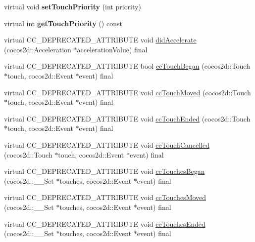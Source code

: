\begin{DoxyCompactItemize}
virtual void {\bfseries set\+Touch\+Priority} (int priority)
\item 
\mbox{\label{classcocostudio_1_1InputDelegate_a5bb459b5e2d2d90d8d548bcb4b376c0d}} 
virtual int {\bfseries get\+Touch\+Priority} () const
\item 
virtual C\+C\+\_\+\+D\+E\+P\+R\+E\+C\+A\+T\+E\+D\+\_\+\+A\+T\+T\+R\+I\+B\+U\+TE void \hyperlink{classcocostudio_1_1InputDelegate_a9d0d273d96b520c48e76a04db3528183}{did\+Accelerate} (cocos2d\+::\+Acceleration $\ast$acceleration\+Value) final
\item 
virtual C\+C\+\_\+\+D\+E\+P\+R\+E\+C\+A\+T\+E\+D\+\_\+\+A\+T\+T\+R\+I\+B\+U\+TE bool \hyperlink{classcocostudio_1_1InputDelegate_aedf0246dc16b6d3d7a1f2b5eddb189c4}{cc\+Touch\+Began} (cocos2d\+::\+Touch $\ast$touch, cocos2d\+::\+Event $\ast$event) final
\item 
virtual C\+C\+\_\+\+D\+E\+P\+R\+E\+C\+A\+T\+E\+D\+\_\+\+A\+T\+T\+R\+I\+B\+U\+TE void \hyperlink{classcocostudio_1_1InputDelegate_af8fcaa42ab9702ac83134f2941722897}{cc\+Touch\+Moved} (cocos2d\+::\+Touch $\ast$touch, cocos2d\+::\+Event $\ast$event) final
\item 
virtual C\+C\+\_\+\+D\+E\+P\+R\+E\+C\+A\+T\+E\+D\+\_\+\+A\+T\+T\+R\+I\+B\+U\+TE void \hyperlink{classcocostudio_1_1InputDelegate_acf0916d41fc3761887e851599333eee1}{cc\+Touch\+Ended} (cocos2d\+::\+Touch $\ast$touch, cocos2d\+::\+Event $\ast$event) final
\item 
virtual C\+C\+\_\+\+D\+E\+P\+R\+E\+C\+A\+T\+E\+D\+\_\+\+A\+T\+T\+R\+I\+B\+U\+TE void \hyperlink{classcocostudio_1_1InputDelegate_ac32180b7e52d02d8563f53e00d98c26f}{cc\+Touch\+Cancelled} (cocos2d\+::\+Touch $\ast$touch, cocos2d\+::\+Event $\ast$event) final
\item 
virtual C\+C\+\_\+\+D\+E\+P\+R\+E\+C\+A\+T\+E\+D\+\_\+\+A\+T\+T\+R\+I\+B\+U\+TE void \hyperlink{classcocostudio_1_1InputDelegate_a701fd376458749cf2c8908caf8a93d7f}{cc\+Touches\+Began} (cocos2d\+::\+\_\+\+\_\+\+Set $\ast$touches, cocos2d\+::\+Event $\ast$event) final
\item 
virtual C\+C\+\_\+\+D\+E\+P\+R\+E\+C\+A\+T\+E\+D\+\_\+\+A\+T\+T\+R\+I\+B\+U\+TE void \hyperlink{classcocostudio_1_1InputDelegate_aee5359b94fa63c90a2953ce5ef064e65}{cc\+Touches\+Moved} (cocos2d\+::\+\_\+\+\_\+\+Set $\ast$touches, cocos2d\+::\+Event $\ast$event) final
\item 
virtual C\+C\+\_\+\+D\+E\+P\+R\+E\+C\+A\+T\+E\+D\+\_\+\+A\+T\+T\+R\+I\+B\+U\+TE void \hyperlink{classcocostudio_1_1InputDelegate_a74d023de77d3ed04abb88f1ed9e252f6}{cc\+Touches\+Ended} (cocos2d\+::\+\_\+\+\_\+\+Set $\ast$touches, cocos2d\+::\+Event $\ast$event) final

\end{DoxyCompactItemize}
